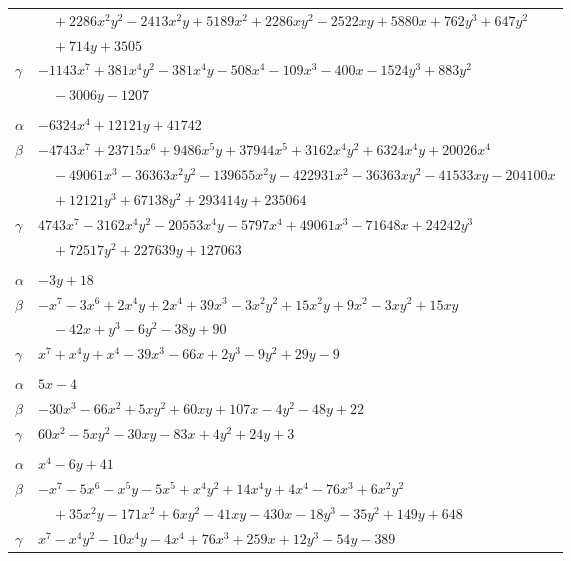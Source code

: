 \documentclass[11pt]{article}
\begin{document}
\begin{longtable}{@{}ll@{}}
 & $\quad +2286x^{2}y^{2}-2413x^{2}y+5189x^{2}+2286xy^{2}-2522xy+5880x+762y^{3}+647y^{2}$\\
 & $\quad +714y+3505$\\
$\gamma$ & $-1143x^{7}+381x^{4}y^{2}-381x^{4}y-508x^{4}-109x^{3}-400x-1524y^{3}+883y^{2}$\\
 & $\quad -3006y-1207$\\
\addlinespace[3pt]
\multicolumn{2}{@{}l}{$\{i,j\}=\{35,64\}$, $k_{ij}=2^{3}\cdot 3^{4}\cdot 5\cdot 7$}\\
$\alpha$ & $-6324x^{4}+12121y+41742$\\
$\beta$ & $-4743x^{7}+23715x^{6}+9486x^{5}y+37944x^{5}+3162x^{4}y^{2}+6324x^{4}y+20026x^{4}$\\
 & $\quad -49061x^{3}-36363x^{2}y^{2}-139655x^{2}y-422931x^{2}-36363xy^{2}-41533xy-204100x$\\
 & $\quad +12121y^{3}+67138y^{2}+293414y+235064$\\
$\gamma$ & $4743x^{7}-3162x^{4}y^{2}-20553x^{4}y-5797x^{4}+49061x^{3}-71648x+24242y^{3}$\\
 & $\quad +72517y^{2}+227639y+127063$\\
\addlinespace[3pt]
\multicolumn{2}{@{}l}{$\{i,j\}=\{35,69\}$, $k_{ij}=2\cdot 3^{2}\cdot 7$}\\
$\alpha$ & $-3y+18$\\
$\beta$ & $-x^{7}-3x^{6}+2x^{4}y+2x^{4}+39x^{3}-3x^{2}y^{2}+15x^{2}y+9x^{2}-3xy^{2}+15xy$\\
 & $\quad -42x+y^{3}-6y^{2}-38y+90$\\
$\gamma$ & $x^{7}+x^{4}y+x^{4}-39x^{3}-66x+2y^{3}-9y^{2}+29y-9$\\
\addlinespace[3pt]
\multicolumn{2}{@{}l}{$\{i,j\}=\{35,88\}$, $k_{ij}=3\cdot 7$}\\
$\alpha$ & $5x-4$\\
$\beta$ & $-30x^{3}-66x^{2}+5xy^{2}+60xy+107x-4y^{2}-48y+22$\\
$\gamma$ & $60x^{2}-5xy^{2}-30xy-83x+4y^{2}+24y+3$\\
\addlinespace[3pt]
\multicolumn{2}{@{}l}{$\{i,j\}=\{35,100\}$, $k_{ij}=2^{2}\cdot 3\cdot 5^{2}$}\\
$\alpha$ & $x^{4}-6y+41$\\
$\beta$ & $-x^{7}-5x^{6}-x^{5}y-5x^{5}+x^{4}y^{2}+14x^{4}y+4x^{4}-76x^{3}+6x^{2}y^{2}$\\
 & $\quad +35x^{2}y-171x^{2}+6xy^{2}-41xy-430x-18y^{3}-35y^{2}+149y+648$\\
$\gamma$ & $x^{7}-x^{4}y^{2}-10x^{4}y-4x^{4}+76x^{3}+259x+12y^{3}-54y-389$\\

\end{longtable}
\end{document}
